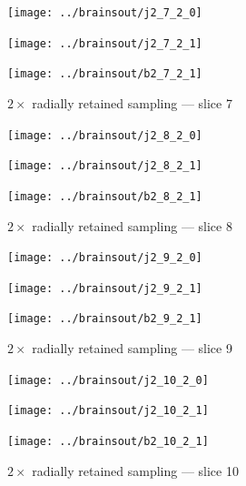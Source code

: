 \documentclass{article}
\begin{document}
\begin{figure}
\begin{centering}

\parbox{\imsizes}{\texttt{[image: ../brainsout/j2\_7\_2\_0]}}

\vspace{\vertseps}

\parbox{\imsizes}{\texttt{[image: ../brainsout/j2\_7\_2\_1]}}
\hfill
\parbox{\imsizes}{\texttt{[image: ../brainsout/b2\_7\_2\_1]}}

\end{centering}
\caption{$2\times$ radially retained sampling --- slice 7}
\end{figure}


\begin{figure}
\begin{centering}

\parbox{\imsizes}{\texttt{[image: ../brainsout/j2\_8\_2\_0]}}

\vspace{\vertseps}

\parbox{\imsizes}{\texttt{[image: ../brainsout/j2\_8\_2\_1]}}
\hfill
\parbox{\imsizes}{\texttt{[image: ../brainsout/b2\_8\_2\_1]}}

\end{centering}
\caption{$2\times$ radially retained sampling --- slice 8}
\end{figure}


\begin{figure}
\begin{centering}

\parbox{\imsizes}{\texttt{[image: ../brainsout/j2\_9\_2\_0]}}

\vspace{\vertseps}

\parbox{\imsizes}{\texttt{[image: ../brainsout/j2\_9\_2\_1]}}
\hfill
\parbox{\imsizes}{\texttt{[image: ../brainsout/b2\_9\_2\_1]}}

\end{centering}
\caption{$2\times$ radially retained sampling --- slice 9}
\end{figure}


\begin{figure}
\begin{centering}

\parbox{\imsizes}{\texttt{[image: ../brainsout/j2\_10\_2\_0]}}

\vspace{\vertseps}

\parbox{\imsizes}{\texttt{[image: ../brainsout/j2\_10\_2\_1]}}
\hfill
\parbox{\imsizes}{\texttt{[image: ../brainsout/b2\_10\_2\_1]}}

\end{centering}
\caption{$2\times$ radially retained sampling --- slice 10}
\end{figure}
\end{document}

